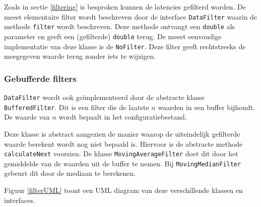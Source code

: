 Zoals in sectie \ref{filtering} is besproken kunnen de latencies gefilterd worden. De meest elementaire filter wordt beschreven door de interface \texttt{DataFilter} waarin de methode \texttt{filter} wordt beschreven. Deze methode ontvangt een \texttt{double} als parameter en geeft een (gefilterde) \texttt{double} terug. De meest eenvoudige implementatie van deze klasse is de \texttt{NoFilter}. Deze filter geeft rechtstreeks de meegegeven waarde terug zonder iets te wijzigen.

\subsubsection{Gebufferde filters}

\texttt{DataFilter} wordt ook geïmplementeerd door de abstracte klasse \texttt{BufferedFilter}. Dit is een filter die de laatste $ n $ waarden in een buffer bijhoudt. De waarde van $ n $ wordt bepaalt in het configuratiebestand. 

Deze klasse is abstract aangezien de manier waarop de uiteindelijk gefilterde waarde \mbox{berekent} wordt nog niet bepaald is. Hiervoor is de abstracte methode \texttt{calculateNext} voorzien. De klasse \texttt{MovingAverageFilter} doet dit door het gemiddelde van de waarden uit de buffer te nemen. Bij \texttt{MovingMedianFilter} gebeurt dit door de mediaan te berekenen.

Figuur \ref{filterUML} toont een UML diagram van deze verschillende klassen en interfaces.
